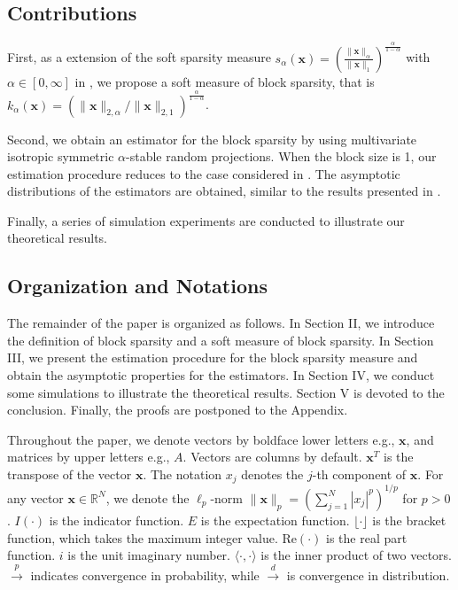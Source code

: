 \documentclass[journal,onecolumn]{IEEEtran}
\begin{document}
\subsection{Contributions}
 First, as a extension of the soft sparsity measure $s_\alpha(\mathbf{x})=\left(\frac{\lVert\mathbf{x}\rVert_{\alpha}}{\lVert\mathbf{x}\rVert_{1}}\right)^{\frac{\alpha}{1-\alpha}}$ with $\alpha\in[0,\infty]$ in \cite{l1,l2}, we propose a soft measure of block sparsity, that is $k_\alpha(\mathbf{x})=\left(\lVert\mathbf{x}\rVert_{2,\alpha}/\lVert\mathbf{x}\rVert_{2,1}\right)^{\frac{\alpha}{1-\alpha}}$.

 Second, we obtain an estimator for the block sparsity by using multivariate isotropic symmetric $\alpha$-stable random projections. When the block size is 1, our estimation procedure reduces to the case considered in \cite{l2}. The asymptotic distributions of the estimators are obtained, similar to the results presented in \cite{l2}.

 Finally, a series of simulation experiments are conducted to illustrate our theoretical results.

\subsection{Organization and Notations}

The remainder of the paper is organized as follows. In Section II, we introduce the definition of block sparsity and a soft measure of block sparsity. In Section III, we present the estimation procedure for the block sparsity measure and obtain the asymptotic properties for the estimators. In Section IV, we conduct some simulations to illustrate the theoretical results. Section V is devoted to the conclusion. Finally, the proofs are postponed to the Appendix.

Throughout the paper, we denote vectors by boldface lower letters e.g., $\mathbf{x}$, and matrices by upper letters e.g., $A$. Vectors are columns by default. $\mathbf{x}^T$ is the transpose of the vector $\mathbf{x}$. The notation $x_j$ denotes the $j$-th component of $\mathbf{x}$. For any vector $\mathbf{x}\in\mathbb{R}^N$, we denote the $\ell_p$-norm  $\lVert\mathbf{x}\rVert_p=(\sum_{j=1}^N|x_j|^p)^{1/p}$ for $p>0$. $I(\cdot)$ is the indicator function. $E$ is the expectation function. $\lfloor\cdot\rfloor$ is the bracket function, which takes the maximum integer value. $\mathrm{Re}(\cdot)$ is the real part function. $i$ is the unit imaginary number. $\langle\cdot,\cdot\rangle$ is the inner product of two vectors. $\overset{p}\longrightarrow$ indicates convergence in probability, while $\overset{d}\longrightarrow$ is convergence in distribution.
\end{document}
